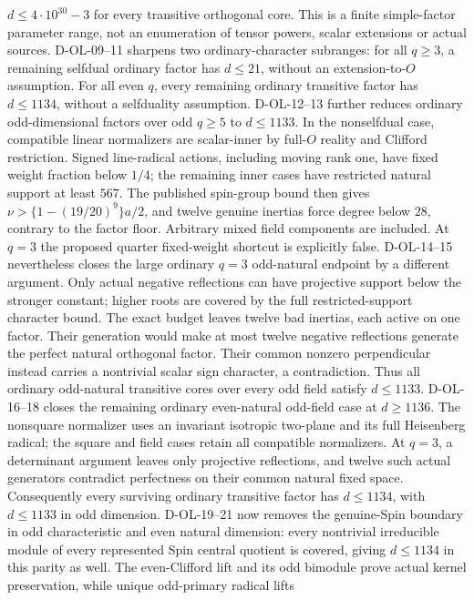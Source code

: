 \documentclass[11pt]{article}
\theoremstyle{remark}\newtheorem{remark}[theorem]{Remark}
\begin{document}
$d\le4\cdot10^{30}-3$ for every transitive orthogonal core.
This is a finite simple-factor parameter range, not an enumeration
of tensor powers, scalar extensions or actual sources.
D-OL-09--11 sharpens two ordinary-character subranges: for all $q\ge3$,
a remaining selfdual ordinary factor has $d\le21$, without an
extension-to-$O$ assumption. For all even $q$, every remaining ordinary
transitive factor has $d\le1134$, without a selfduality assumption.
D-OL-12--13 further reduces ordinary odd-dimensional factors over odd
$q\ge5$ to $d\le1133$. In the nonselfdual case, compatible linear
normalizers are scalar-inner by full-$O$ reality and Clifford restriction.
Signed line-radical actions, including moving rank one, have fixed weight
fraction below $1/4$; the remaining inner cases have restricted natural
support at least $567$. The published spin-group bound then gives
$\nu>\{1-(19/20)^9\}a/2$, and twelve genuine inertias force degree
below $28$, contrary to the factor floor. Arbitrary mixed field components
are included. At $q=3$ the proposed quarter fixed-weight shortcut is
explicitly false. D-OL-14--15 nevertheless closes the large ordinary
$q=3$ odd-natural endpoint by a different argument. Only actual negative
reflections can have projective support below the stronger constant;
higher roots are covered by the full restricted-support character bound.
The exact budget leaves twelve bad inertias, each active on one factor.
Their generation would make at most twelve negative reflections generate
the perfect natural orthogonal factor. Their common nonzero perpendicular
instead carries a nontrivial scalar sign character, a contradiction.
Thus all ordinary odd-natural transitive cores over every odd field
satisfy $d\le1133$. D-OL-16--18 closes the remaining ordinary
even-natural odd-field case at $d\ge1136$. The nonsquare normalizer
uses an invariant isotropic two-plane and its full Heisenberg radical;
the square and field cases retain all compatible normalizers. At
$q=3$, a determinant argument leaves only projective reflections,
and twelve such actual generators contradict perfectness on their
common natural fixed space. Consequently every surviving ordinary
transitive factor has $d\le1134$, with $d\le1133$ in odd dimension.
D-OL-19--21 now removes the genuine-Spin boundary in odd
characteristic and even natural dimension: every nontrivial
irreducible module of every represented Spin central quotient
is covered, giving $d\le1134$ in this parity as well.
The even-Clifford lift and its odd bimodule prove actual
kernel preservation, while unique odd-primary radical lifts
\end{document}
